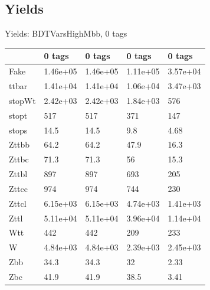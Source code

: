 
\subsection{Yields}

\begin{frame}{Yields: BDTVarsHighMbb, 0 tags}
\begin{center}
  \begin{tabular}{l| >{\centering\let\newline\\\arraybackslash\hspace{0pt}}m{1.4cm}| >{\centering\let\newline\\\arraybackslash\hspace{0pt}}m{1.4cm}| >{\centering\let\newline\\\arraybackslash\hspace{0pt}}m{1.4cm}| >{\centering\let\newline\\\arraybackslash\hspace{0pt}}m{1.4cm}}
    & 0 tags & 0 tags & 0 tags & 0 tags \\
 \hline \hline
    Fake& 1.46e+05 & 1.46e+05 & 1.11e+05 & 3.57e+04 \\
 \hline
    ttbar& 1.41e+04 & 1.41e+04 & 1.06e+04 & 3.47e+03 \\
 \hline
    stopWt& 2.42e+03 & 2.42e+03 & 1.84e+03 & 576 \\
 \hline
    stopt& 517 & 517 & 371 & 147 \\
 \hline
    stops& 14.5 & 14.5 & 9.8 & 4.68 \\
 \hline
    Zttbb& 64.2 & 64.2 & 47.9 & 16.3 \\
 \hline
    Zttbc& 71.3 & 71.3 & 56 & 15.3 \\
 \hline
    Zttbl& 897 & 897 & 693 & 205 \\
 \hline
    Zttcc& 974 & 974 & 744 & 230 \\
 \hline
    Zttcl& 6.15e+03 & 6.15e+03 & 4.74e+03 & 1.41e+03 \\
 \hline
    Zttl& 5.11e+04 & 5.11e+04 & 3.96e+04 & 1.14e+04 \\
 \hline
    Wtt& 442 & 442 & 209 & 233 \\
 \hline
    W& 4.84e+03 & 4.84e+03 & 2.39e+03 & 2.45e+03 \\
 \hline
    Zbb& 34.3 & 34.3 & 32 & 2.33 \\
 \hline
    Zbc& 41.9 & 41.9 & 38.5 & 3.41 \\

\end{tabular}
\end{center}
\end{frame}
